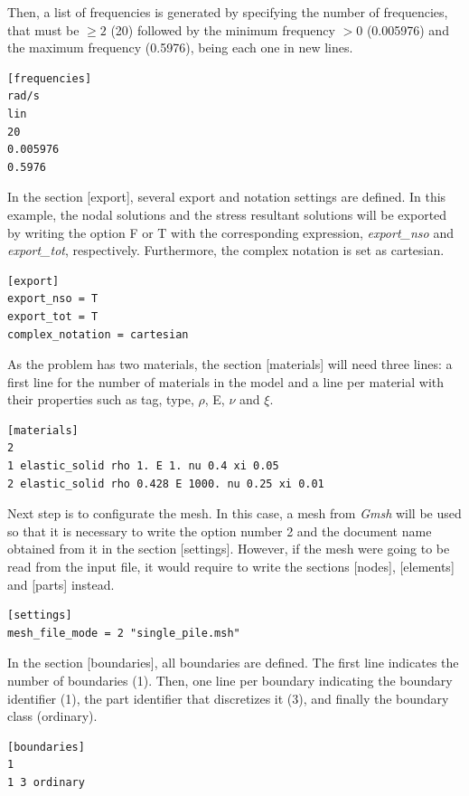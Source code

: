 \documentclass[a4]{article}
\begin{document}
Then, a list of frequencies is generated by specifying the number of frequencies, that must be $\geq 2$ (20) followed by the minimum frequency $>0$ (0.005976) and the maximum frequency (0.5976), being each one in new lines.

\begin{Verbatim}
[frequencies]
rad/s
lin
20
0.005976
0.5976
\end{Verbatim}

In the section [export], several export and notation settings are defined. In this example, the nodal solutions and the stress resultant solutions will be exported by writing the option F or T with the corresponding expression, \textit{export\_nso} and \textit{export\_tot}, respectively. Furthermore, the complex notation is set as cartesian. 

\begin{Verbatim}
[export]
export_nso = T
export_tot = T
complex_notation = cartesian
\end{Verbatim}

As the problem has two materials, the section [materials] will need three lines: a first line for the number of materials in the model and a line per material with their properties such as tag, type, $\rho$, E, $\nu$ and $ \xi $.

\begin{Verbatim}
[materials]
2
1 elastic_solid rho 1. E 1. nu 0.4 xi 0.05
2 elastic_solid rho 0.428 E 1000. nu 0.25 xi 0.01
\end{Verbatim}

Next step is to configurate the mesh. In this case, a mesh from \textit{Gmsh} will be used so that it is necessary to write the option number 2 and the document name obtained from it in the section [settings]. However, if the mesh were going to be read from the input file, it would require to write the sections [nodes], [elements] and [parts] instead.

\begin{Verbatim}	
[settings]
mesh_file_mode = 2 "single_pile.msh"
\end{Verbatim}

In the section [boundaries], all boundaries are defined. The first line indicates the number of boundaries (1). Then, one line per boundary indicating the boundary identifier (1), the part identifier that discretizes it (3), and finally the boundary class (ordinary).

\begin{Verbatim}
[boundaries]
1
1 3 ordinary
\end{Verbatim}
\end{document}
